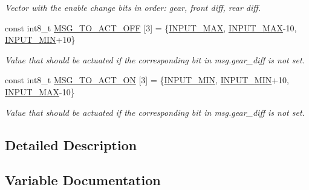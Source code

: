 \begin{DoxyCompactItemize}
\begin{DoxyCompactList}\small\item\em Vector with the enable change bits in order\+: gear, front diff, rear diff. \end{DoxyCompactList}\item 
const int8\+\_\+t \hyperlink{group__MsgBitPositions_ga7e9874545710fd223a9d783f83e11a62}{M\+S\+G\+\_\+\+T\+O\+\_\+\+A\+C\+T\+\_\+\+O\+FF} \mbox{[}3\mbox{]} = \{\hyperlink{group__ActuationToOutput_ga54b4e4d7476d53406564c1e9159df212}{I\+N\+P\+U\+T\+\_\+\+M\+AX}, \hyperlink{group__ActuationToOutput_ga54b4e4d7476d53406564c1e9159df212}{I\+N\+P\+U\+T\+\_\+\+M\+AX}-\/10, \hyperlink{group__ActuationToOutput_ga1f805f05ca679b7b28951bfa6659294d}{I\+N\+P\+U\+T\+\_\+\+M\+IN}+10\}\hypertarget{group__MsgBitPositions_ga7e9874545710fd223a9d783f83e11a62}{}\label{group__MsgBitPositions_ga7e9874545710fd223a9d783f83e11a62}

\begin{DoxyCompactList}\small\item\em Value that should be actuated if the corresponding bit in msg.\+gear\+\_\+diff is not set. \end{DoxyCompactList}\item 
const int8\+\_\+t \hyperlink{group__MsgBitPositions_gaf2abc78dd02137e1e3c98f381c80efc5}{M\+S\+G\+\_\+\+T\+O\+\_\+\+A\+C\+T\+\_\+\+ON} \mbox{[}3\mbox{]} = \{\hyperlink{group__ActuationToOutput_ga1f805f05ca679b7b28951bfa6659294d}{I\+N\+P\+U\+T\+\_\+\+M\+IN}, \hyperlink{group__ActuationToOutput_ga1f805f05ca679b7b28951bfa6659294d}{I\+N\+P\+U\+T\+\_\+\+M\+IN}+10, \hyperlink{group__ActuationToOutput_ga54b4e4d7476d53406564c1e9159df212}{I\+N\+P\+U\+T\+\_\+\+M\+AX}-\/10\}\hypertarget{group__MsgBitPositions_gaf2abc78dd02137e1e3c98f381c80efc5}{}\label{group__MsgBitPositions_gaf2abc78dd02137e1e3c98f381c80efc5}

\begin{DoxyCompactList}\small\item\em Value that should be actuated if the corresponding bit in msg.\+gear\+\_\+diff is not set. \end{DoxyCompactList}\end{DoxyCompactItemize}


\subsection{Detailed Description}


\subsection{Variable Documentation}
